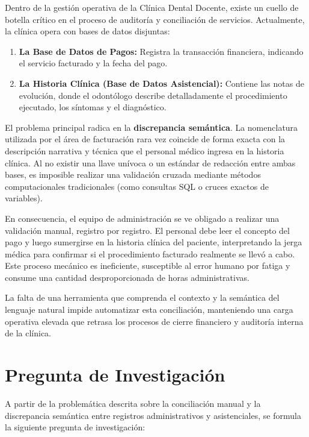 Dentro de la gestión operativa de la Clínica Dental Docente, existe un cuello de botella crítico en el proceso de auditoría y conciliación de servicios. Actualmente, la clínica opera con bases de datos disjuntas:

\begin{enumerate}
    \item \textbf{La Base de Datos de Pagos:} Registra la transacción financiera, indicando el servicio facturado y la fecha del pago.
    \item \textbf{La Historia Clínica (Base de Datos Asistencial):} Contiene las notas de evolución, donde el odontólogo describe detalladamente el procedimiento ejecutado, los síntomas y el diagnóstico.
\end{enumerate}

El problema principal radica en la \textbf{discrepancia semántica}. La nomenclatura utilizada por el área de facturación rara vez coincide de forma exacta con la descripción narrativa y técnica que el personal médico ingresa en la historia clínica. Al no existir una llave unívoca o un estándar de redacción entre ambas bases, es imposible realizar una validación cruzada mediante métodos computacionales tradicionales (como consultas SQL o cruces exactos de variables).

En consecuencia, el equipo de administración se ve obligado a realizar una validación manual, registro por registro. El personal debe leer el concepto del pago y luego sumergirse en la historia clínica del paciente, interpretando la jerga médica para confirmar si el procedimiento facturado realmente se llevó a cabo. Este proceso mecánico es ineficiente, susceptible al error humano por fatiga y consume una cantidad desproporcionada de horas administrativas.

La falta de una herramienta que comprenda el contexto y la semántica del lenguaje natural impide automatizar esta conciliación, manteniendo una carga operativa elevada que retrasa los procesos de cierre financiero y auditoría interna de la clínica.

\section{Pregunta de Investigación}

A partir de la problemática descrita sobre la conciliación manual y la discrepancia semántica entre registros administrativos y asistenciales, se formula la siguiente pregunta de investigación:


